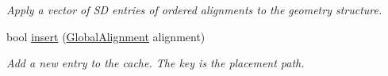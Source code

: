 \begin{DoxyCompactItemize}
\begin{DoxyCompactList}\small\item\em Apply a vector of SD entries of ordered alignments to the geometry structure. \item\end{DoxyCompactList}\item 
bool \hyperlink{class_d_d4hep_1_1_alignments_1_1_global_alignment_cache_a023ee1b04bc17e8be3a8225f79316daf}{insert} (\hyperlink{class_d_d4hep_1_1_alignments_1_1_global_alignment}{GlobalAlignment} alignment)
\begin{DoxyCompactList}\small\item\em Add a new entry to the cache. The key is the placement path. \item\end{DoxyCompactList}\end{DoxyCompactItemize}
